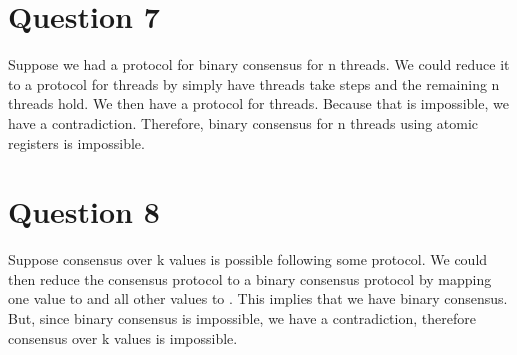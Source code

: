 \documentclass[11pt, letterpaper]{article}
\begin{document}
\section*{Question 7}
\label{sec:question_7}

Suppose we had a protocol for binary consensus for n   threads. We could reduce it to a protocol for  threads by simply have  threads take steps and the remaining n   threads hold. We then have a protocol for  threads. Because that is impossible, we have a contradiction. Therefore, binary consensus for n   threads using atomic registers is impossible.

\section*{Question 8}
\label{sec:question_8}

Suppose consensus over k values is possible following some protocol. We could then reduce the consensus protocol to a binary consensus protocol by mapping one value to  and all other values to . This implies that we have binary consensus. But, since binary consensus is impossible, we have a contradiction, therefore consensus over k values is impossible.
\end{document}
